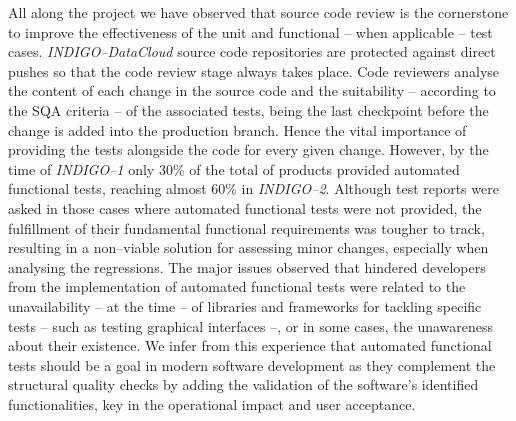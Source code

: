 All along the project we have observed that source code review is the cornerstone to
improve the effectiveness of the unit and functional -- when applicable -- test cases. 
{\sl INDIGO--DataCloud} source code repositories are protected against direct pushes 
so that the code review stage always takes place. Code reviewers analyse the content
of each change in the source code and the suitability -- according to the SQA criteria -- of the
associated tests, being the last checkpoint before the change is added into the
production branch. Hence the vital importance of providing the tests alongside the
code for every given change.
However, by the time of
{\sl INDIGO--1} only 30\% of the total of products provided automated functional tests,
reaching almost 60\% in {\sl INDIGO--2}. Although test reports were asked in those cases
where automated functional tests were not provided, the fulfillment of 
their fundamental functional requirements was tougher to track, resulting in a non--viable
solution for assessing minor changes, especially when analysing the regressions. The major issues observed that hindered developers from the 
implementation of automated functional tests were related to the unavailability
-- at the time -- of libraries and frameworks for tackling specific tests -- such as 
testing graphical interfaces --, or in some cases, the unawareness about their existence.
We infer from this experience that automated functional tests should be a goal in modern
software development as they complement the structural quality checks by adding the
validation of the software's identified functionalities, key in the operational impact 
and user acceptance. 

